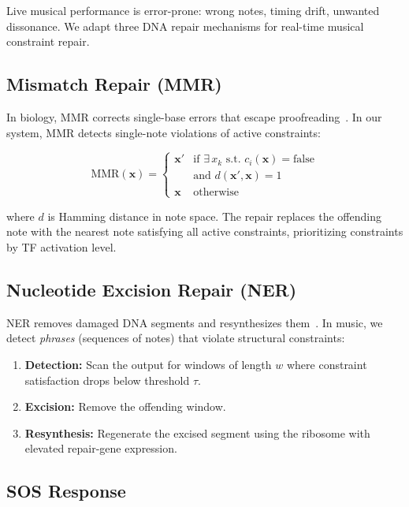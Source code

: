 \documentclass[11pt,a4paper]{article}
\begin{document}
Live musical performance is error-prone: wrong notes, timing drift, unwanted dissonance. We adapt three DNA repair mechanisms for real-time musical constraint repair.

\subsection{Mismatch Repair (MMR)}

In biology, MMR corrects single-base errors that escape proofreading~\citep{modrich1991}. In our system, MMR detects single-note violations of active constraints:

\begin{equation}
  \text{MMR}(\mathbf{x}) = \begin{cases}
    \mathbf{x}' & \text{if } \exists\, x_k \text{ s.t. } c_i(\mathbf{x}) = \text{false} \\
    & \text{and } d(\mathbf{x}', \mathbf{x}) = 1 \\
    \mathbf{x} & \text{otherwise}
  \end{cases}
\end{equation}

where $d$ is Hamming distance in note space. The repair replaces the offending note with the nearest note satisfying all active constraints, prioritizing constraints by TF activation level.

\subsection{Nucleotide Excision Repair (NER)}

NER removes damaged DNA segments and resynthesizes them~\citep{sancar1996}. In music, we detect \emph{phrases} (sequences of notes) that violate structural constraints:

\begin{enumerate}
  \item \textbf{Detection:} Scan the output for windows of length $w$ where constraint satisfaction drops below threshold $\tau$.
  \item \textbf{Excision:} Remove the offending window.
  \item \textbf{Resynthesis:} Regenerate the excised segment using the ribosome with elevated repair-gene expression.
\end{enumerate}

\subsection{SOS Response}
\end{document}
